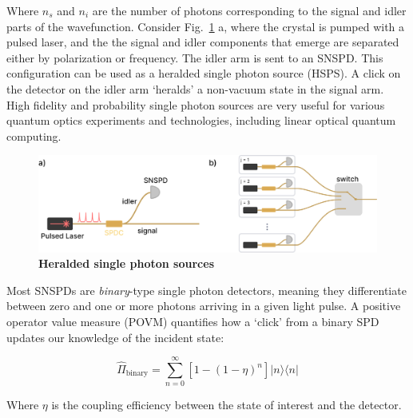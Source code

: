 \documentclass[11pt]{caltech_thesis} %
\begin{document}
Where $n_s$ and $n_i$ are the number of photons corresponding to the signal and idler parts of the wavefunction. Consider Fig.~\ref{fig:hsps} a, where the crystal is pumped with a pulsed laser, and the the signal and idler components that emerge are separated either by polarization or frequency. The idler arm is sent to an SNSPD. This configuration can be used as a heralded single photon source (HSPS). A click on the detector on the idler arm `heralds' a non-vacuum state in the signal arm. High fidelity and probability single photon sources are very useful for various quantum optics experiments and technologies, including linear optical quantum computing.

\hypertarget{fig:hsps}{%
\begin{figure}
\centering
\includegraphics{chapter_05/figs_05/hsps_light.pdf}
\caption[{Heralded single photon source designs}]{\textbf{Heralded single photon sources}}
\label{fig:hsps}
\end{figure}
}

Most SNSPDs are \emph{binary}-type single photon detectors, meaning they differentiate between zero and one or more photons arriving in a given light pulse. A positive operator value measure (POVM) quantifies how a `click' from a binary SPD updates our knowledge of the incident state:

$$\hat{\Pi}_{\text {binary}} = \sum_{n=0}^{\infty}\left[1-(1-\eta)^{n}\right]|n\rangle\langle n|$$

Where $\eta$ is the coupling efficiency between the state of interest and the detector.
\end{document}
